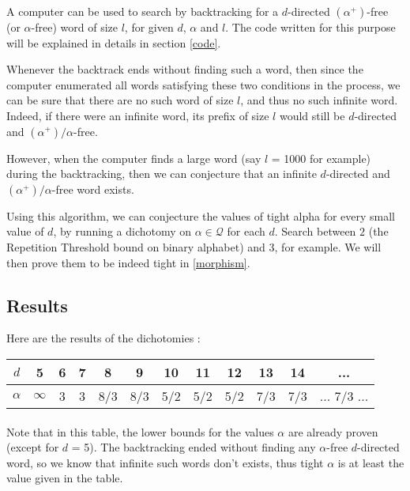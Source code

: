 \documentclass[a4paper]{article}
\theoremstyle{definition}
\begin{document}
A computer can be used to search by backtracking for a $d$-directed $(\alpha^+)$-free (or $\alpha$-free) word of size $l$, for given $d$, $\alpha$ and $l$. The code written for this purpose will be explained in details in section \ref{code}. 

Whenever the backtrack ends without finding such a word, then since the computer enumerated all words satisfying these two conditions in the process, we can be sure that there are no such word of size $l$, and thus no such infinite word. Indeed, if there were an infinite word, its prefix of size $l$ would still be $d$-directed and $(\alpha^+)/\alpha$-free.

However, when the computer finds a large word (say $l$ = 1000 for example) during the backtracking, then we can conjecture that an infinite $d$-directed and $(\alpha^+)/\alpha$-free word exists.

Using this algorithm, we can conjecture the values of tight alpha for every small value of $d$, by running a dichotomy on $\alpha \in \mathcal{Q}$ for each $d$. Search between $2$ (the Repetition Threshold bound on binary alphabet) and $3$, for example. We will then prove them to be indeed tight in \ref{morphism}. 

\subsection{Results}
\label{results}

Here are the results of the dichotomies :

\begin{center}
\begin{tabular}{ | c || c | c | c | c | c | c | c | c | c | c | c |}
\hline
 $d$ & 5 & 6 & 7 & 8 & 9 & 10 & 11 & 12 & 13 & 14 & ... \\ 
\hline
 $\alpha$ & $\infty$ & 3 & 3 & 8/3 & 8/3 & 5/2 & 5/2 & 5/2 & 7/3 & 7/3 & ... 7/3 ... \\
\hline
\end{tabular}
\end{center}

\paragraph{}

Note that in this table, the lower bounds for the values $\alpha$ are already proven (except for $d$ = 5). The backtracking ended without finding any $\alpha$-free $d$-directed word, so we know that infinite such words don't exists, thus tight $\alpha$ is at least the value given in the table.
\end{document}
